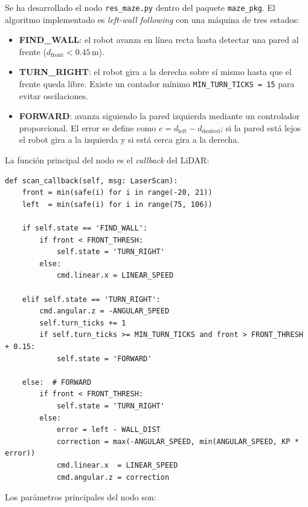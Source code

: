 Se ha desarrollado el nodo \texttt{res\_maze.py} dentro del paquete \texttt{maze\_pkg}.
El algoritmo implementado es \textit{left-wall following} con una máquina de tres
estados:

\begin{itemize}
  \item \textbf{FIND\_WALL}: el robot avanza en línea recta hasta detectar una pared
        al frente ($d_\text{front} < 0.45$\,m).
  \item \textbf{TURN\_RIGHT}: el robot gira a la derecha sobre sí mismo hasta que el
        frente queda libre. Existe un contador mínimo \texttt{MIN\_TURN\_TICKS\,=\,15}
        para evitar oscilaciones.
  \item \textbf{FORWARD}: avanza siguiendo la pared izquierda mediante un controlador
        proporcional. El error se define como $e = d_\text{left} - d_\text{desired}$;
        si la pared está lejos el robot gira a la izquierda y si está cerca gira a la
        derecha.
\end{itemize}

La función principal del nodo es el \textit{callback} del LiDAR:

\begin{lstlisting}[style=python]
def scan_callback(self, msg: LaserScan):
    front = min(safe(i) for i in range(-20, 21))
    left  = min(safe(i) for i in range(75, 106))

    if self.state == 'FIND_WALL':
        if front < FRONT_THRESH:
            self.state = 'TURN_RIGHT'
        else:
            cmd.linear.x = LINEAR_SPEED

    elif self.state == 'TURN_RIGHT':
        cmd.angular.z = -ANGULAR_SPEED
        self.turn_ticks += 1
        if self.turn_ticks >= MIN_TURN_TICKS and front > FRONT_THRESH + 0.15:
            self.state = 'FORWARD'

    else:  # FORWARD
        if front < FRONT_THRESH:
            self.state = 'TURN_RIGHT'
        else:
            error = left - WALL_DIST
            correction = max(-ANGULAR_SPEED, min(ANGULAR_SPEED, KP * error))
            cmd.linear.x  = LINEAR_SPEED
            cmd.angular.z = correction
\end{lstlisting}

Los parámetros principales del nodo son:

